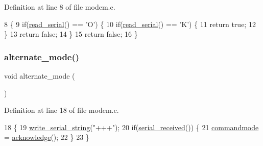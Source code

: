 Definition at line 8 of file modem.\+c.


\begin{DoxyCode}
8                    \{
9     \textcolor{keywordflow}{if}(\hyperlink{a00056_ad343a7018f74662f794968dfa0523841_ad343a7018f74662f794968dfa0523841}{read\_serial}() == \textcolor{charliteral}{'O'}) \{
10         \textcolor{keywordflow}{if}(\hyperlink{a00056_ad343a7018f74662f794968dfa0523841_ad343a7018f74662f794968dfa0523841}{read\_serial}() == \textcolor{charliteral}{'K'}) \{
11             \textcolor{keywordflow}{return} \textcolor{keyword}{true};
12         \}
13         \textcolor{keywordflow}{return} \textcolor{keyword}{false};
14     \}
15     \textcolor{keywordflow}{return} \textcolor{keyword}{false};
16 \}
\end{DoxyCode}
\mbox{\label{a00047_ace378eaa88c0b7f0cdafe97d064e36fb_ace378eaa88c0b7f0cdafe97d064e36fb}} 
\subsubsection{\texorpdfstring{alternate\+\_\+mode()}{alternate\_mode()}}
{\footnotesize\ttfamily void alternate\+\_\+mode (\begin{DoxyParamCaption}{ }\end{DoxyParamCaption})}



Definition at line 18 of file modem.\+c.


\begin{DoxyCode}
18                       \{
19     \hyperlink{a00056_aabbe45d6670f606c53ba38a5fb14b650_aabbe45d6670f606c53ba38a5fb14b650}{write\_serial\_string}(\textcolor{stringliteral}{"+++"});
20     \textcolor{keywordflow}{if}(\hyperlink{a00056_af10f0e64ba89e8635aa7245ca08297c5_af10f0e64ba89e8635aa7245ca08297c5}{serial\_received}()) \{
21         \hyperlink{a00044_aaf612f2f6c2c9931ab63296b3514a037_aaf612f2f6c2c9931ab63296b3514a037}{commandmode} = \hyperlink{a00044_a8529dba543149138317e327931bf5a5c_a8529dba543149138317e327931bf5a5c}{acknowledge}();
22     \}
23 \}
\end{DoxyCode}
\mbox{\label{a00047_a5e56e19ccc8f36690d515dd09948db10_a5e56e19ccc8f36690d515dd09948db10}} 
